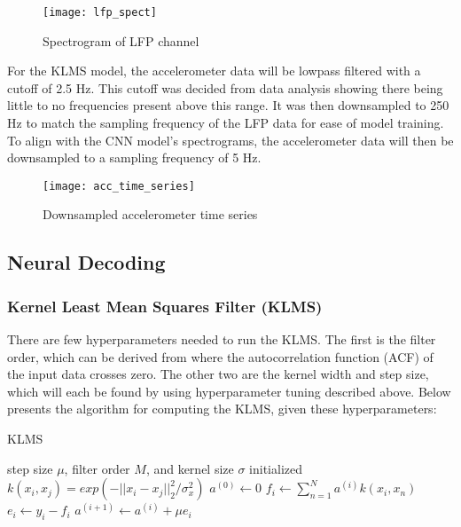 \documentclass[12pt]{article}
\begin{document}
\begin{figure}[h]
\caption{Spectrogram of LFP channel}
\centering
\texttt{[image: lfp\_spect]}
\end{figure}

For the KLMS model, the accelerometer data will be lowpass filtered with a cutoff of 2.5 Hz. This cutoff was decided from data analysis showing there being little to no frequencies present above this range. It was then downsampled to 250 Hz to match the sampling frequency of the LFP data for ease of model training. To align with the CNN model's spectrograms, the accelerometer data will then be downsampled to a sampling frequency of 5 Hz.

\begin{figure}[h]
\caption{Downsampled accelerometer time series}
\centering
\texttt{[image: acc\_time\_series]}
\end{figure}

\subsection{Neural Decoding}

\subsubsection{Kernel Least Mean Squares Filter (KLMS)}

There are few hyperparameters needed to run the KLMS. The first is the filter order, which can be derived from where the autocorrelation function (ACF) of the input data crosses zero. The other two are the kernel width and step size, which will each be found by using hyperparameter tuning described above. Below presents the algorithm for computing the KLMS, given these hyperparameters:

\begin{algorithm}
\caption{KLMS}\label{alg:cap}
\begin{algorithmic}
   \Require step size $\mu$, filter order $M$, and kernel size
   $\sigma$ initialized  
   \State $k(x_i, x_j) = exp(-|| x_i - x_j ||^2_2 / \sigma^2_x)$
   \State $a^{(0)} \gets 0$  
     \State $f_i \gets \sum_{n=1}^{N} a^{(i)} k(x_i, x_n)$\   
     \State $e_i \gets y_i - f_i$    
     \State $a^{(i+1)} \gets a^{(i)} + \mu e_i$   
   \EndFor 
\end{algorithmic}
\end{algorithm}
\end{document}
